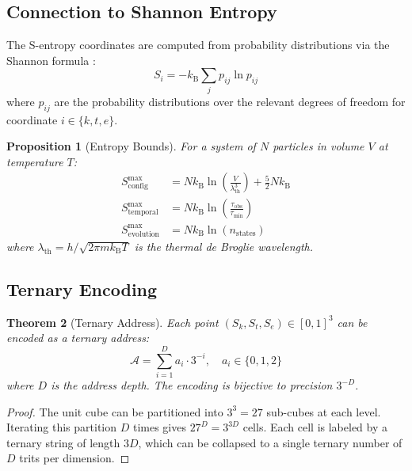 \documentclass[twocolumn,10pt,a4paper]{article}
\newtheorem{theorem}{Theorem}[section]
\newtheorem{proposition}[theorem]{Proposition}
\theoremstyle{definition}
\theoremstyle{remark}
\newcommand{\kB}{k_{\mathrm{B}}}
\newcommand{\Sk}{S_k}
\newcommand{\St}{S_t}
\newcommand{\Se}{S_e}
\begin{document}
\subsection{Connection to Shannon Entropy}

The S-entropy coordinates are computed from probability distributions via the Shannon formula \cite{shannon1948}:
\begin{equation}
    S_i = -\kB \sum_j p_{ij} \ln p_{ij}
\end{equation}
where $p_{ij}$ are the probability distributions over the relevant degrees of freedom for coordinate $i \in \{k, t, e\}$.

\begin{proposition}[Entropy Bounds]
For a system of $N$ particles in volume $V$ at temperature $T$:
\begin{align}
    S_{\text{config}}^{\max} &= N\kB \ln\left(\frac{V}{\lambda_{\text{th}}^3}\right) + \frac{5}{2}N\kB \\
    S_{\text{temporal}}^{\max} &= N\kB \ln\left(\frac{\tau_{\text{obs}}}{\tau_{\text{min}}}\right) \\
    S_{\text{evolution}}^{\max} &= N\kB \ln(n_{\text{states}})
\end{align}
where $\lambda_{\text{th}} = h/\sqrt{2\pi m \kB T}$ is the thermal de Broglie wavelength.
\end{proposition}

\subsection{Ternary Encoding}

\begin{theorem}[Ternary Address]
Each point $(\Sk, \St, \Se) \in [0,1]^3$ can be encoded as a ternary address:
\begin{equation}
    \mathcal{A} = \sum_{i=1}^{D} a_i \cdot 3^{-i}, \quad a_i \in \{0, 1, 2\}
\end{equation}
where $D$ is the address depth. The encoding is bijective to precision $3^{-D}$.
\end{theorem}

\begin{proof}
The unit cube can be partitioned into $3^3 = 27$ sub-cubes at each level. Iterating this partition $D$ times gives $27^D = 3^{3D}$ cells. Each cell is labeled by a ternary string of length $3D$, which can be collapsed to a single ternary number of $D$ trits per dimension.
\end{proof}
\end{document}
